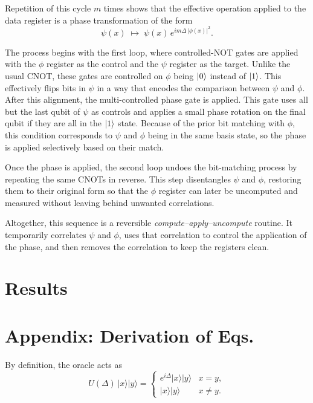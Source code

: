 \documentclass[12pt,a4paper]{article}
\begin{document}
Repetition of this cycle $m$ times shows that the effective operation applied to the data register is a phase transformation of the form
\[
\psi(x) \;\mapsto\; \psi(x) \, e^{i m \Delta \, |\phi(x)|^{2}}.
\]


The process begins with the first loop, where controlled-NOT gates are applied with the $\phi$ register as the control and the $\psi$ register as the target. Unlike the usual CNOT, these gates are controlled on $\phi$ being $\ket{0}$ instead of $\ket{1}$. This effectively flips bits in $\psi$ in a way that encodes the comparison between $\psi$ and $\phi$. After this alignment, the multi-controlled phase gate is applied. This gate uses all but the last qubit of $\psi$ as controls and applies a small phase rotation on the final qubit if they are all in the $\ket{1}$ state. Because of the prior bit matching with $\phi$, this condition corresponds to $\psi$ and $\phi$ being in the same basis state, so the phase is applied selectively based on their match.

Once the phase is applied, the second loop undoes the bit-matching process by repeating the same CNOTs in reverse. This step disentangles $\psi$ and $\phi$, restoring them to their original form so that the $\phi$ register can later be uncomputed and measured without leaving behind unwanted correlations. 

Altogether, this sequence is a reversible \emph{compute–apply–uncompute} routine. It temporarily correlates $\psi$ and $\phi$, uses that correlation to control the application of the phase, and then removes the correlation to keep the registers clean.


\clearpage
\section{Results}




\clearpage
\appendix
\section*{Appendix: Derivation of Eqs.}

By definition, the oracle acts as
\begin{equation}
U(\Delta)\,|x\rangle|y\rangle =
\begin{cases}
e^{i\Delta}|x\rangle|y\rangle & x=y, \\[6pt]
|x\rangle|y\rangle & x\neq y .
\end{cases}
\end{equation}
\end{document}

